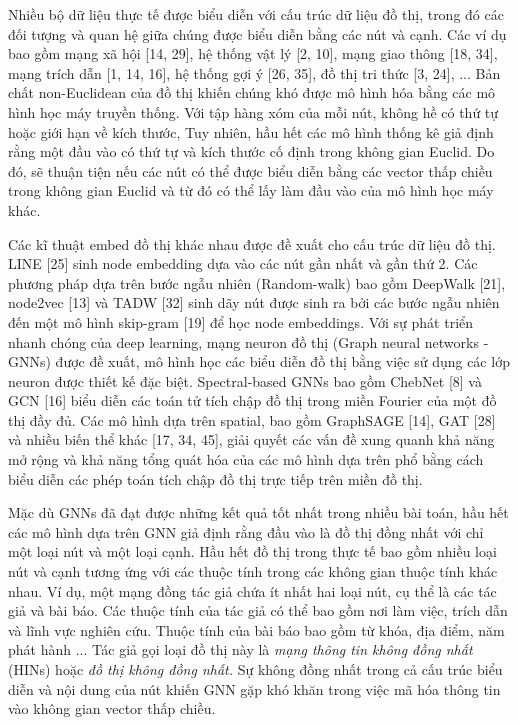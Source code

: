 Nhiều bộ dữ liệu thực tế được biểu diễn với cấu trúc dữ liệu đồ thị, trong đó các đối tượng và quan hệ giữa chúng được biểu diễn bằng các nút và cạnh. Các ví dụ bao gồm mạng xã hội [14, 29], hệ thống vật lý [2, 10], mạng giao thông [18, 34], mạng trích dẫn [1, 14, 16], hệ thống gợi ý [26, 35], đồ thị tri thức [3, 24], ... Bản chất non-Euclidean của đồ thị khiến chúng khó được mô hình hóa bằng các mô hình học máy truyền thống. Với tập hàng xóm của mỗi nút, không hề có thứ tự hoặc giới hạn về kích thước, Tuy nhiên, hầu hết các mô hình thống kê giả định rằng một đầu vào có thứ tự và kích thước cố định trong không gian Euclid. Do đó, sẽ thuận tiện nếu các nút có thể được biểu diễn bằng các vector thấp chiều trong không gian Euclid và từ đó có thể lấy làm đầu vào của mô hình học máy khác. 

Các kĩ thuật embed đồ thị khác nhau được đề xuất cho cấu trúc dữ liệu đồ thị. LINE [25] sinh node embedding dựa vào các nút gần nhất và gần thứ 2. Các phương pháp dựa trên bước ngẫu nhiên (Random-walk) bao gồm DeepWalk [21], node2vec [13] và TADW [32] sinh dãy nút được sinh ra bởi các bước ngẫu nhiên đến một mô hình skip-gram [19] để học node embeddings. Với sự phát triển nhanh chóng của deep learning, mạng neuron đồ thị (Graph neural networks - GNNs) được đề xuất, mô hình học các biểu diễn đồ thị bằng việc sử dụng các lớp neuron được thiết kế đặc biệt. Spectral-based GNNs bao gồm ChebNet [8] và GCN [16] biểu diễn các toán tử tích chập đồ thị trong miền Fourier của một đồ thị đầy đủ. Các mô hình dựa trên spatial, bao gồm GraphSAGE [14], GAT [28] và nhiều biến thể khác [17, 34, 45], giải quyết các vấn đề xung quanh khả năng mở rộng và khả năng tổng quát hóa của các mô hình dựa trên phổ bằng cách biểu diễn các phép toán tích chập đồ thị trực tiếp trên miền đồ thị. 

Mặc dù GNNs đã đạt được những kết quả tốt nhất trong nhiều bài toán, hầu hết các mô hình dựa trên GNN giả định rằng đầu vào là đồ thị đồng nhất với chỉ một loại nút và một loại cạnh. Hầu hết đồ thị trong thực tế bao gồm nhiều loại nút và cạnh tương ứng với các thuộc tính trong các không gian thuộc tính khác nhau. Ví dụ, một mạng đồng tác giả chứa ít nhất hai loại nút, cụ thể là các tác giả và bài báo. Các thuộc tính của tác giả có thể bao gồm nơi làm việc, trích dẫn và lĩnh vực nghiên cứu. Thuộc tính của bài báo bao gồm từ khóa, địa điểm, năm phát hành ... Tác giả gọi loại đồ thị này là \textit{mạng thông tin không đồng nhất} (HINs) hoặc \textit{đồ thị không đồng nhất.}
 Sự không đồng nhất trong cả cấu trúc biểu diễn và nội dung của nút khiến GNN gặp khó khăn trong việc mã hóa thông tin vào không gian vector thấp chiều. 

